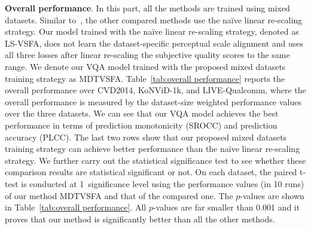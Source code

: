 \documentclass[twocolumn]{svjour3}          \smartqed  \usepackage{graphicx}
\begin{document}
\textbf{Overall performance}. 
In this part, all the methods are trained using mixed datasets. 
Similar to~\citet{korhonen2019two}, the other compared methods use the na\"ive linear re-scaling strategy. 
Our model trained with the na\"ive linear re-scaling strategy, denoted as LS-VSFA, does not learn the dataset-specific perceptual scale alignment and uses all three losses after linear re-scaling the subjective quality scores to the same range.
We denote our VQA model trained with the proposed mixed datasets training strategy as MDTVSFA. 
Table~\ref{tab:overall performance} reports the overall performance over CVD2014, KoNViD-1k, and LIVE-Qualcomm, where the overall performance is measured by the dataset-size weighted performance values over the three datasets. 
We can see that our VQA model achieves the best performance in terms of prediction monotonicity (SROCC) and prediction accuracy (PLCC). 
The last two rows show that our proposed mixed datasets training strategy can achieve better performance than the na\"ive linear re-scaling strategy.
We further carry out the statistical significance test to see whether these comparison results are statistical significant or not. 
On each dataset, the paired t-test is conducted at 1\textperthousand~significance level using the performance values (in 10 runs) of our method MDTVSFA and that of the compared one. 
The $p$-values are shown in Table~\ref{tab:overall performance}. 
All $p$-values are far smaller than 0.001 and it proves that our method is significantly better than all the other methods.
\end{document}
